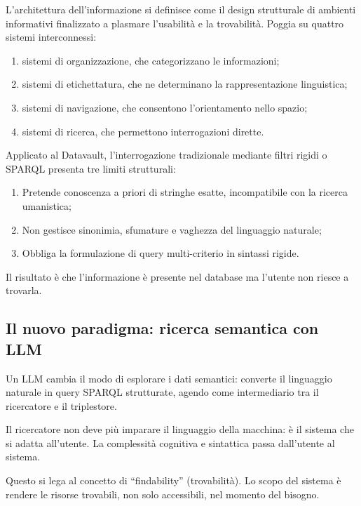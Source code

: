     L'architettura dell'informazione si definisce come il design strutturale di ambienti informativi finalizzato a plasmare l'usabilità e la trovabilità\cite{Mor08}. Poggia su quattro sistemi interconnessi:

    \begin{enumerate}[label={(\roman*)}]
        \item sistemi di organizzazione, che categorizzano le informazioni;
        \item sistemi di etichettatura, che ne determinano la rappresentazione linguistica;
        \item sistemi di navigazione, che consentono l'orientamento nello spazio;
        \item sistemi di ricerca, che permettono interrogazioni dirette.
    \end{enumerate}

    Applicato al Datavault, l'interrogazione tradizionale mediante filtri rigidi o SPARQL presenta tre limiti strutturali:

    \begin{enumerate}
        \item Pretende conoscenza a priori di stringhe esatte, incompatibile con la ricerca umanistica\hfill\cite{Vas24};
        \item Non gestisce sinonimia, sfumature e vaghezza del linguaggio naturale;
        \item Obbliga la formulazione di query multi-criterio in sintassi rigide.
    \end{enumerate}

    Il risultato è che l'informazione è presente nel database ma l'utente non riesce a trovarla.

    \subsection{Il nuovo paradigma: ricerca semantica con LLM}\label{subsec:paradigma_semantico}

    Un LLM cambia il modo di esplorare i dati semantici: converte il linguaggio naturale in query SPARQL strutturate, agendo come intermediario tra il ricercatore e il triplestore.\@

    Il ricercatore non deve più imparare il linguaggio della macchina: è il sistema che si adatta all'utente. La complessità cognitiva e sintattica passa dall'utente al sistema.

    Questo si lega al concetto di ``findability'' (trovabilità)\cite{Ros07}. Lo scopo del sistema è rendere le risorse trovabili, non solo accessibili, nel momento del bisogno.

